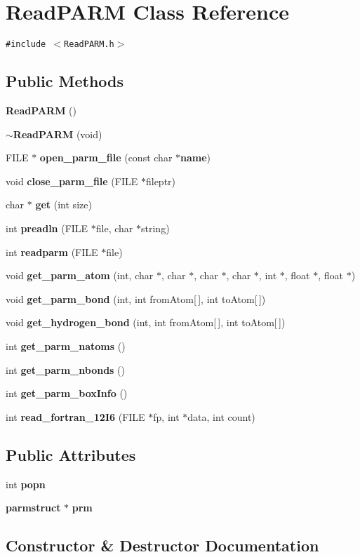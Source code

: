 \section{Read\-PARM  Class Reference}
\label{classReadPARM}
{\tt \#include $<$Read\-PARM.h$>$}

\subsection*{Public Methods}
\begin{CompactItemize}
\item 
{\bf Read\-PARM} ()
\item 
{\bf $\sim$Read\-PARM} (void)
\item 
FILE $\ast$ {\bf open\_\-parm\_\-file} (const char $\ast${\bf name})
\item 
void {\bf close\_\-parm\_\-file} (FILE $\ast$fileptr)
\item 
char $\ast$ {\bf get} (int size)
\item 
int {\bf preadln} (FILE $\ast$file, char $\ast$string)
\item 
int {\bf readparm} (FILE $\ast$file)
\item 
void {\bf get\_\-parm\_\-atom} (int, char $\ast$, char $\ast$, char $\ast$, char $\ast$, int $\ast$, float $\ast$, float $\ast$)
\item 
void {\bf get\_\-parm\_\-bond} (int, int from\-Atom[$\,$], int to\-Atom[$\,$])
\item 
void {\bf get\_\-hydrogen\_\-bond} (int, int from\-Atom[$\,$], int to\-Atom[$\,$])
\item 
int {\bf get\_\-parm\_\-natoms} ()
\item 
int {\bf get\_\-parm\_\-nbonds} ()
\item 
int {\bf get\_\-parm\_\-box\-Info} ()
\item 
int {\bf read\_\-fortran\_\-12I6} (FILE $\ast$fp, int $\ast$data, int count)
\end{CompactItemize}
\subsection*{Public Attributes}
\begin{CompactItemize}
\item 
int {\bf popn}
\item 
{\bf parmstruct} $\ast$ {\bf prm}
\end{CompactItemize}


\subsection{Constructor \& Destructor Documentation}
